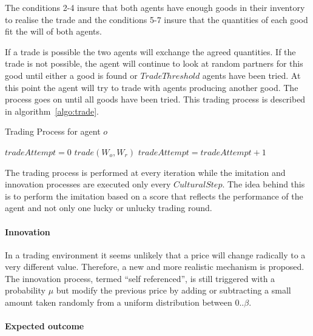 \documentclass{wscpaperproc}
\begin{document}
The conditions 2-4 insure that both agents have enough goods in their inventory to realise the trade and the conditions 5-7 insure that the quantities of each good fit the will of both agents.



If a trade is possible the two agents will exchange the agreed quantities. If the trade is not possible, the agent will continue to look at random partners for this good until either a good is found or $TradeThreshold$ agents have been tried. At this point the agent will try to trade with agents producing another good. The process goes on until all goods have been tried. This trading process is described in algorithm~\ref{algo:trade}.

\begin{algorithm}
\caption{Trading Process for agent $o$}
\label{algo:trade}
	\begin{algorithmic}[1]
	\scriptsize
			\State $tradeAttempt = 0$
					\State $trade(W_o,W_r)$
				\Else
					\State $tradeAttempt = tradeAttempt + 1$					
				\EndIf
			\EndFor
		\EndFor
\end{algorithmic}
\end{algorithm}

The trading process is performed at every iteration while the imitation and innovation processes are executed only every $CulturalStep$. The idea behind this is to perform the imitation based on a score that reflects the performance of the agent and not only one lucky or unlucky trading round.

\paragraph{Innovation} In a trading environment it seems unlikely that a price will change radically to a very different value. Therefore, a new and more realistic mechanism is proposed. The innovation process, termed ``self referenced'', is still triggered with a probability $\mu$ 
but modify the previous price by adding or subtracting a small amount taken randomly from a uniform  distribution between $0 .. \beta$.


\paragraph{Expected outcome} 
\end{document}
